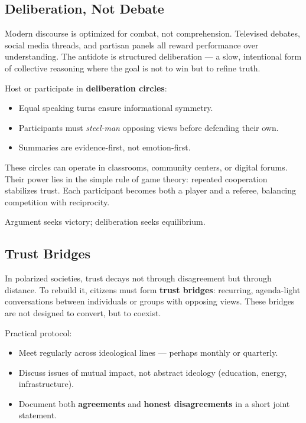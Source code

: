 \documentclass[12pt,twoside]{book}
\begin{document}
\subsection*{Deliberation, Not Debate}

Modern discourse is optimized for combat, not comprehension.  
Televised debates, social media threads, and partisan panels all reward performance over understanding.  
The antidote is structured deliberation --- a slow, intentional form of collective reasoning where the goal is not to win but to refine truth.

Host or participate in \textbf{deliberation circles}:  
\begin{itemize}
  \item Equal speaking turns ensure informational symmetry.  
  \item Participants must \emph{steel-man} opposing views before defending their own.  
  \item Summaries are evidence-first, not emotion-first.  
\end{itemize}

These circles can operate in classrooms, community centers, or digital forums.  
Their power lies in the simple rule of game theory: repeated cooperation stabilizes trust.  
Each participant becomes both a player and a referee, balancing competition with reciprocity. \\ 

\begin{keyidea}
Argument seeks victory; deliberation seeks equilibrium.
\end{keyidea}

\subsection*{Trust Bridges}

In polarized societies, trust decays not through disagreement but through distance.  
To rebuild it, citizens must form \textbf{trust bridges}: recurring, agenda-light conversations between individuals or groups with opposing views.  
These bridges are not designed to convert, but to coexist.  

Practical protocol:
\begin{itemize}
  \item Meet regularly across ideological lines --- perhaps monthly or quarterly.  
  \item Discuss issues of mutual impact, not abstract ideology (education, energy, infrastructure).  
  \item Document both \textbf{agreements} and \textbf{honest disagreements} in a short joint statement.  
\end{itemize}
\end{document}
